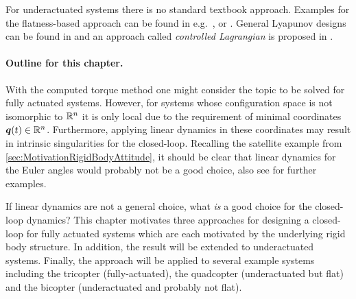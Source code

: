 For underactuated systems there is no standard textbook approach.
Examples for the flatness-based approach can be found in e.g.\ \cite{RathinamFlatness}, \cite{MurrayFlatCataloge} or \cite[sec.\ 7.1]{Martin:FlatSystems}.
General Lyapunov designs can be found in \cite{OlfatiSaberDiss} and an approach called \textit{controlled Lagrangian} is proposed in \cite{bloch2000controlled}.

\paragraph{Outline for this chapter.}
With the computed torque method one might consider the topic to be solved for fully actuated systems.
However, for systems whose configuration space is not isomorphic to $\mathbb{R}^{n}$ it is only local due to the requirement of minimal coordinates $\boldsymbol{q}(t)\in\mathbb{R}^{n}$.
Furthermore, applying linear dynamics in these coordinates may result in intrinsic singularities for the closed-loop.
Recalling the satellite example from \autoref{sec:MotivationRigidBodyAttitude}, it should be clear that linear dynamics for the Euler angles would probably not be a good choice, also see \cite{Konz:AT} for further examples.

If linear dynamics are not a general choice, what \textit{is} a good choice for the closed-loop dynamics?
This chapter motivates three approaches for designing a closed-loop for fully actuated systems which are each motivated by the underlying rigid body structure.
In addition, the result will be extended to underactuated systems.
Finally, the approach will be applied to several example systems including the tricopter (fully-actuated), the quadcopter (underactuated but flat) and the bicopter (underactuated and probably not flat).


